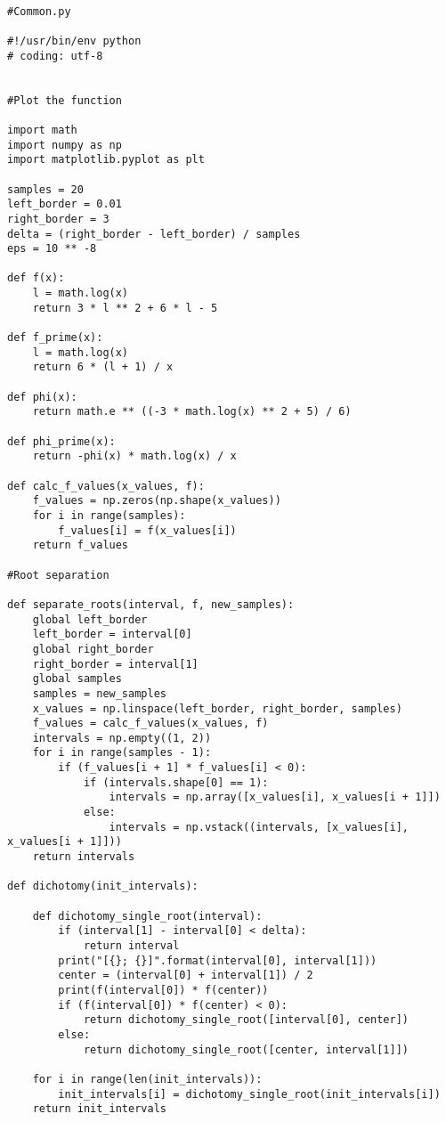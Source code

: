 \documentclass[14pt, a4paper]{article}
\begin{document}
\begin{lstlisting}

#Common.py

#!/usr/bin/env python
# coding: utf-8


#Plot the function

import math
import numpy as np
import matplotlib.pyplot as plt

samples = 20
left_border = 0.01
right_border = 3
delta = (right_border - left_border) / samples
eps = 10 ** -8

def f(x):
    l = math.log(x)
    return 3 * l ** 2 + 6 * l - 5

def f_prime(x):
    l = math.log(x)
    return 6 * (l + 1) / x

def phi(x):
    return math.e ** ((-3 * math.log(x) ** 2 + 5) / 6)

def phi_prime(x):
    return -phi(x) * math.log(x) / x

def calc_f_values(x_values, f):
    f_values = np.zeros(np.shape(x_values))
    for i in range(samples):
        f_values[i] = f(x_values[i])
    return f_values

#Root separation

def separate_roots(interval, f, new_samples):
    global left_border
    left_border = interval[0]
    global right_border
    right_border = interval[1]
    global samples
    samples = new_samples
    x_values = np.linspace(left_border, right_border, samples)
    f_values = calc_f_values(x_values, f)
    intervals = np.empty((1, 2))
    for i in range(samples - 1):
        if (f_values[i + 1] * f_values[i] < 0):
            if (intervals.shape[0] == 1):
                intervals = np.array([x_values[i], x_values[i + 1]])
            else:
                intervals = np.vstack((intervals, [x_values[i], x_values[i + 1]]))
    return intervals

def dichotomy(init_intervals):
    
    def dichotomy_single_root(interval):
        if (interval[1] - interval[0] < delta):
            return interval
        print("[{}; {}]".format(interval[0], interval[1]))
        center = (interval[0] + interval[1]) / 2
        print(f(interval[0]) * f(center))
        if (f(interval[0]) * f(center) < 0):
            return dichotomy_single_root([interval[0], center])
        else:
            return dichotomy_single_root([center, interval[1]])
        
    for i in range(len(init_intervals)):
        init_intervals[i] = dichotomy_single_root(init_intervals[i])
    return init_intervals


\end{lstlisting}
\end{document}
